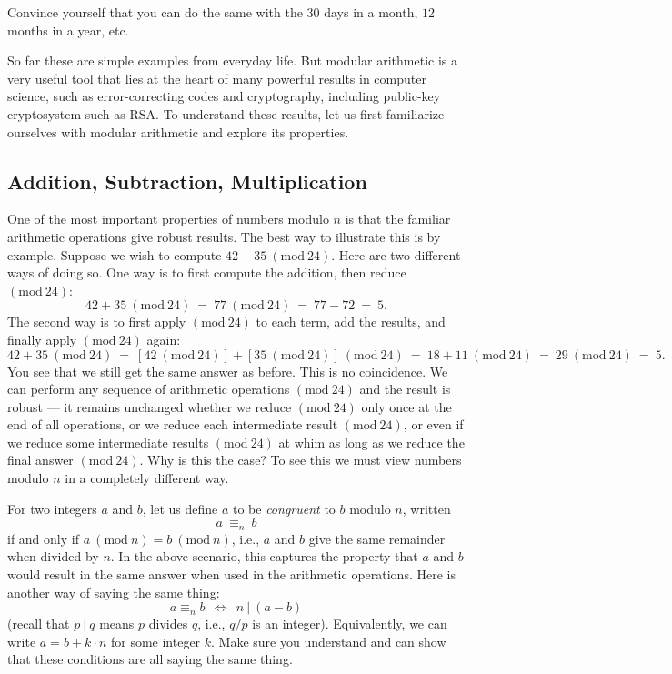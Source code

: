 \documentclass[11pt]{article}
\newcounter{thm}
\renewcommand{\pmod}[1]{~(\text{mod}~#1)}
\begin{document}
Convince yourself that you can do the same with the $30$ days in a month, $12$ months in a year, etc.

So far these are simple examples from everyday life. But modular arithmetic is a very useful tool that lies at the heart of many powerful results in computer science, such as error-correcting codes and cryptography, including public-key cryptosystem such as RSA. To understand these results, let us first familiarize ourselves with modular arithmetic and explore its properties.



\subsection{Addition, Subtraction, Multiplication}
\label{Sec:ModAdd}

One of the most important properties of numbers modulo $n$ is that the familiar arithmetic operations give robust results. The best way to illustrate this is by example. Suppose we wish to compute $42 + 35 \pmod{24}$. Here are two different ways of doing so. One way is to first compute the addition, then reduce $(\text{mod}~24)$:
$$42 + 35 \pmod{24} ~=~ 77  \pmod{24} ~=~ 77 - 72 ~=~ 5.$$
The second way is to first apply $(\text{mod}~24)$ to each term, add the results, and finally apply $(\text{mod}~24)$ again:
$$42 + 35 \pmod{24} ~=~ [42 \pmod{24}] + [35 \pmod{24}] \pmod{24} ~=~ 18 + 11 \pmod{24} ~=~ 29 \pmod{24} ~=~ 5.$$
You see that we still get the same answer as before.
This is no coincidence. We can perform any sequence of arithmetic operations $(\text{mod}~24)$ and the result is robust --- 
it remains unchanged whether we reduce $(\text{mod}~24)$ only once at the end of all operations, or we reduce each intermediate result $(\text{mod}~24)$, or even if we reduce some intermediate results $(\text{mod}~24)$ at whim as long as we reduce the final 
answer $(\text{mod}~24)$. Why is this the case? To see this we must view numbers modulo $n$ in a completely different way. 

For two integers $a$ and $b$, let us define $a$ to be {\em congruent} to $b$ modulo $n$, written
$$a ~\equiv_n~ b$$
if and only if $a \pmod{n} = b \pmod{n}$, i.e., $a$ and $b$ give the same remainder when divided by $n$. 
In the above scenario, this captures the property that $a$ and $b$ would result in the same answer when used in the arithmetic operations. Here is another way of
saying the same thing:
$$a \equiv_n b ~~ \Leftrightarrow ~~ n \:|\: (a-b)$$
(recall that $p \:|\: q$ means $p$ divides $q$, i.e., $q/p$ is an integer). 
Equivalently, we can write $a = b + k \cdot n$ for some integer $k$. Make sure you understand and can 
show that these conditions are all saying the same thing. 
\end{document}
